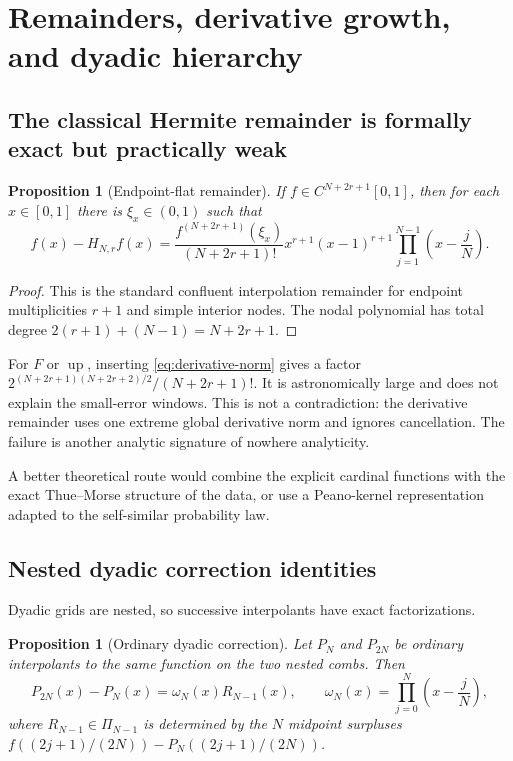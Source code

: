 \documentclass[11pt,oneside]{article}
\newtheorem{proposition}[theorem]{Proposition}
\theoremstyle{definition}
\theoremstyle{remark}
\newcommand{\Up}{\operatorname{up}}
\begin{document}
\section{Remainders, derivative growth, and dyadic hierarchy}
\label{sec:remainder}

\subsection{The classical Hermite remainder is formally exact but practically weak}

\begin{proposition}[Endpoint-flat remainder]
\label{prop:remainder}
If $f\in C^{N+2r+1}[0,1]$, then for each $x\in[0,1]$ there is $\xi_x\in(0,1)$ such that
\begin{equation}
 f(x)-H_{N,r}f(x)
 =\frac{f^{(N+2r+1)}(\xi_x)}{(N+2r+1)!}
 x^{r+1}(x-1)^{r+1}
 \prod_{j=1}^{N-1}\left(x-\frac jN\right).
 \label{eq:Hermite-remainder}
\end{equation}
\end{proposition}

\begin{proof}
This is the standard confluent interpolation remainder for endpoint multiplicities $r+1$
and simple interior nodes.  The nodal polynomial has total degree
$2(r+1)+(N-1)=N+2r+1$.
\end{proof}

For $F$ or $\Up$, inserting \eqref{eq:derivative-norm} gives a factor
$2^{(N+2r+1)(N+2r+2)/2}/(N+2r+1)!$.  It is astronomically large and does not explain the
small-error windows.  This is not a contradiction: the derivative remainder uses one
extreme global derivative norm and ignores cancellation.  The failure is another analytic
signature of nowhere analyticity.

A better theoretical route would combine the explicit cardinal functions with the exact
Thue--Morse structure of the data, or use a Peano-kernel representation adapted to the
self-similar probability law.

\subsection{Nested dyadic correction identities}

Dyadic grids are nested, so successive interpolants have exact factorizations.

\begin{proposition}[Ordinary dyadic correction]
\label{prop:nested-ordinary}
Let $P_N$ and $P_{2N}$ be ordinary interpolants to the same function on the two nested
combs.  Then
\begin{equation}
 P_{2N}(x)-P_N(x)
 =\omega_N(x)R_{N-1}(x),
 \qquad
 \omega_N(x)=\prod_{j=0}^{N}\left(x-\frac jN\right),
 \label{eq:nested-ordinary}
\end{equation}
where $R_{N-1}\in\Pi_{N-1}$ is determined by the $N$ midpoint surpluses
$f((2j+1)/(2N))-P_N((2j+1)/(2N))$.
\end{proposition}
\end{document}

